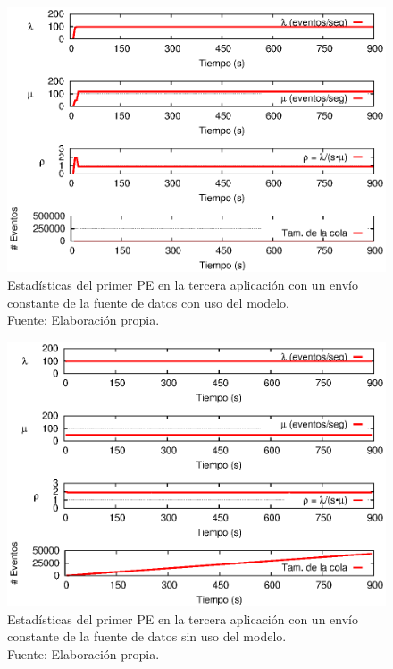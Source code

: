 \begin{figure}[!htp]
    \centering
    \captionsetup{justification=centering}
    \includegraphics[scale=1]{images/exp/app3/cm/logical/statusOnePE.eps}
    \caption[Estad\'isticas del primer PE en la tercera aplicaci\'on con un env\'io constante de la fuente de datos con uso del modelo.]{Estad\'isticas del primer PE en la tercera aplicaci\'on con un env\'io constante de la fuente de datos con uso del modelo.\\Fuente: Elaboraci\'on propia.}
    \label{fig:app3-statusOnePE-cm}
\end{figure}

\begin{figure}[!htp]
    \centering
    \captionsetup{justification=centering}
    \includegraphics[scale=1]{images/exp/app3/sm/logical/statusOnePE.eps}
    \caption[Estad\'isticas del primer PE en la tercera aplicaci\'on con un env\'io constante de la fuente de datos sin uso del modelo.]{Estad\'isticas del primer PE en la tercera aplicaci\'on con un env\'io constante de la fuente de datos sin uso del modelo.\\Fuente: Elaboraci\'on propia.}
    \label{fig:app3-statusOnePE-sm}
\end{figure}

